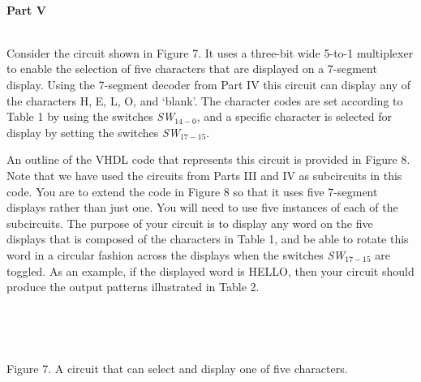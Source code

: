 \documentclass[psfig,10pt,fullpage]{article}
\begin{document}
~\\
\noindent
{\bf Part V}

~\\
\noindent
Consider the circuit shown in Figure 7. It uses a three-bit wide 5-to-1 multiplexer to
enable the selection of five characters that are displayed on a 7-segment display. Using the
7-segment decoder from Part IV this circuit can display any of the characters H, E, L, O,
and `blank'. The character codes are set according to Table 1 by using the switches 
{\it SW}$_{14-0}$, and a specific character is selected for display by setting the
switches {\it SW}$_{17-15}$.

An outline of the VHDL code that represents this circuit is 
provided in Figure 8. Note that we have
used the circuits from Parts III and IV as subcircuits in this code. You are to
extend the code in Figure 8 so that it uses five 7-segment displays rather than just one.
You will need to use five instances of each of the subcircuits. The
purpose of your circuit is to display any word on the five displays that is composed of the
characters in Table 1, and be able to rotate this word in a circular fashion across the
displays when the switches {\it SW}$_{17-15}$ are toggled. As an example,
if the displayed word is HELLO, then your circuit should produce the output patterns
illustrated in Table 2.

~\\
\begin{figure}[H]
\scriptsize
\centerline{
\hbox{}}
\end{figure}
~\\
\centerline{Figure 7.  A circuit that can select and display one of five characters.}
~\\
\end{document}
